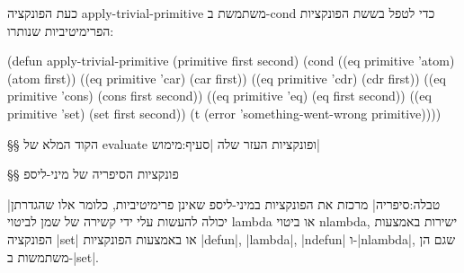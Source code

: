 כעת הפונקציה apply-trivial-primitive משתמשת ב-cond כדי לטפל בששת הפונקציות הפרימיטיביות שנותרו:
\begin{KERNEL}
(defun apply-trivial-primitive (primitive first second)
  (cond ((eq primitive 'atom) (atom first))
        ((eq primitive 'car) (car first))
        ((eq primitive 'cdr) (cdr first))
        ((eq primitive 'cons) (cons first second))
        ((eq primitive 'eq) (eq first second))
        ((eq primitive 'set) (set first second))
        (t (error 'something-went-wrong primitive))))
\end{KERNEL}

\eject
§§ הקוד המלא של evaluate ופונקציות העזר שלה
|סעיף:מימוש|

\immediate\closeout {}

\begin{LTR}
  
\end{LTR}

\eject
§§ פונקציות הסיפריה של מיני-ליספ

|טבלה:סיפריה| מרכזת את הפונקציות במיני-ליספ שאינן פרימיטיביות, כלומר אלו
שהגדרתן יכולה להעשות עלי ידי קשירה של שמן לביטוי lambda או ביטוי nlambda,
ישירות באמצעות הפונקציה \E|set| או באמצעות הפונקציות \E|defun|, \E|lambda|,
\E|ndefun| ו-\E|nlambda|, שגם הן משתמשות ב-\E|set|.

